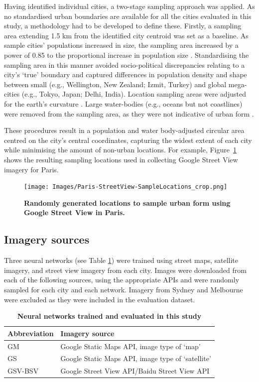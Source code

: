 \documentclass[Crown,sageh,times]{sagej}
\begin{document}
Having identified individual cities, a two-stage sampling approach was applied. As no standardised urban boundaries are available for all the cities evaluated in this study, a methodology had to be developed to define these. Firstly, a sampling area extending 1.5 km from the identified city centroid \citep{UN2014} was set as a baseline. As sample cities' populations increased in size, the sampling area increased by a power of 0.85 to the proportional increase in population size \citep{Barthelemy2016}. Standardising the sampling area in this manner avoided socio-political discrepancies relating to a city's `true' boundary and captured differences in population density and shape between small (e.g., Wellington, New Zealand; Izmit, Turkey) and global mega-cities (e.g., Tokyo, Japan;  Delhi, India). Location sampling areas were adjusted for the earth's curvature \citep{Sinnott1984}. Large water-bodies (e.g., oceans but not coastlines) were removed from the sampling area, as they were not indicative of urban form . 

These procedures result in a population and water body-adjusted circular area centred on the city's central coordinates, capturing the widest extent of each city while minimising the amount of non-urban locations. For example, Figure~\ref{fig:parissample} shows the resulting sampling locations used in collecting Google Street View imagery for Paris. 


\begin{figure}[!htbp] 
\centering    
\texttt{[image: Images/Paris-StreetView-SampleLocations\_crop.png]} 
\caption{\bf Randomly generated locations to sample urban form using Google Street View in Paris.} 
\label{fig:parissample}  
\end{figure}

\label{methodsimagery}
\subsection{Imagery sources}

Three neural networks (see Table \ref{tab:neuralnetworks}) were trained using street maps, satellite imagery, and street view imagery from each city. Images were downloaded from each of the following sources, using the appropriate APIs and were randomly sampled for each city and each network. Imagery from Sydney and Melbourne were excluded as they were included in the evaluation dataset. 


\begin{table}[!htbp]
\caption{\bf Neural networks trained and evaluated in this study \label{tab:neuralnetworks}}     
\begin{tabular}{ l l }
 \hline Abbreviation   &  Imagery source \\ \hline
GM & Google Static Maps API, image type of `map'     \\ 
GS & Google Static Maps API, image type of `satellite'      \\
GSV-BSV & Google Street View API/Baidu Street View API     \\ \hline

\end{tabular}
\end{table}
\end{document}
